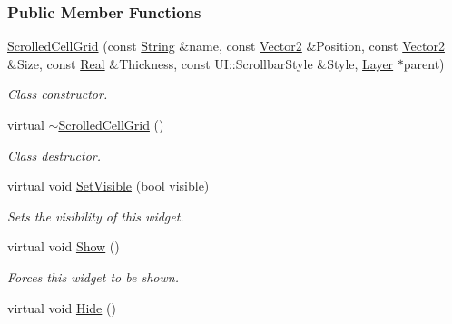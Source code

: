 \subsubsection*{Public Member Functions}
\begin{DoxyCompactItemize}
\item 
\hyperlink{classphys_1_1UI_1_1ScrolledCellGrid_ac5c8216540515fef2d30ddd075ccb941}{ScrolledCellGrid} (const \hyperlink{namespacephys_aa03900411993de7fbfec4789bc1d392e}{String} \&name, const \hyperlink{classphys_1_1Vector2}{Vector2} \&Position, const \hyperlink{classphys_1_1Vector2}{Vector2} \&Size, const \hyperlink{namespacephys_af7eb897198d265b8e868f45240230d5f}{Real} \&Thickness, const UI::ScrollbarStyle \&Style, \hyperlink{classphys_1_1UI_1_1Layer}{Layer} $\ast$parent)
\begin{DoxyCompactList}\small\item\em Class constructor. \item\end{DoxyCompactList}\item 
\hypertarget{classphys_1_1UI_1_1ScrolledCellGrid_a27a91d4fe26c101718f8593c8775f0cb}{
virtual \hyperlink{classphys_1_1UI_1_1ScrolledCellGrid_a27a91d4fe26c101718f8593c8775f0cb}{$\sim$ScrolledCellGrid} ()}
\label{d5/db4/classphys_1_1UI_1_1ScrolledCellGrid_a27a91d4fe26c101718f8593c8775f0cb}

\begin{DoxyCompactList}\small\item\em Class destructor. \item\end{DoxyCompactList}\item 
virtual void \hyperlink{classphys_1_1UI_1_1ScrolledCellGrid_aef5b78f205e75d33fff05623a1b61aa4}{SetVisible} (bool visible)
\begin{DoxyCompactList}\small\item\em Sets the visibility of this widget. \item\end{DoxyCompactList}\item 
virtual void \hyperlink{classphys_1_1UI_1_1ScrolledCellGrid_af75c87ada3a1bac3dda208485ebc5f94}{Show} ()
\begin{DoxyCompactList}\small\item\em Forces this widget to be shown. \item\end{DoxyCompactList}\item 
\hypertarget{classphys_1_1UI_1_1ScrolledCellGrid_a489a88ad115f0059dabb4519f6139bd8}{
virtual void \hyperlink{classphys_1_1UI_1_1ScrolledCellGrid_a489a88ad115f0059dabb4519f6139bd8}{Hide} ()}
\label{d5/db4/classphys_1_1UI_1_1ScrolledCellGrid_a489a88ad115f0059dabb4519f6139bd8}


\end{DoxyCompactItemize}
